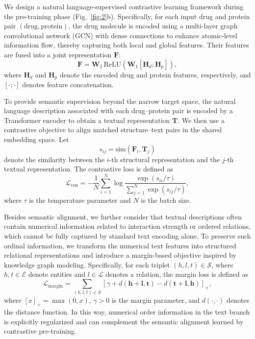 \documentclass[unnumsec,webpdf,contemporary,large]{oup-authoring-template}%
\theoremstyle{thmstyleone}%
\theoremstyle{thmstyletwo}%
\theoremstyle{thmstylethree}%
\begin{document}
We design a natural language-supervised contrastive learning framework during the pre-training phase (Fig.~\ref{fig:2}b). Specifically, for each input drug and protein pair $(\text{drug},\text{protein})$, the drug molecule is encoded using a multi-layer graph convolutional network (GCN) with dense connections to enhance atomic-level information flow, thereby capturing both local and global features. Their features are fused into a joint representation $\mathbf{F}$:
\begin{equation}
\mathbf{F} = \mathbf{W}_2 \, \mathrm{ReLU}\!\left(\mathbf{W}_1[\mathbf{H}_d;\mathbf{H}_p]\right),
\end{equation}
where $\mathbf{H}_d$ and $\mathbf{H}_p$ denote the encoded drug and protein features, respectively, and $[\cdot;\cdot]$ denotes feature concatenation.

To provide semantic supervision beyond the narrow target space, the natural language description associated with each drug--protein pair is encoded by a Transformer encoder to obtain a textual representation $\mathbf{T}$. We then use a contrastive objective to align matched structure--text pairs in the shared embedding space. Let
\begin{equation}
s_{ij} = \mathrm{sim}(\mathbf{F}_i,\mathbf{T}_j)
\end{equation}
denote the similarity between the $i$-th structural representation and the $j$-th textual representation. The contrastive loss is defined as
\begin{equation}
\mathcal{L}_{\mathrm{con}} =
-\frac{1}{N}\sum_{i=1}^{N}
\log
\frac{\exp(s_{ii}/\tau)}
{\sum_{j=1}^{N}\exp(s_{ij}/\tau)},
\end{equation}
where $\tau$ is the temperature parameter and $N$ is the batch size.

Besides semantic alignment, we further consider that textual descriptions often contain numerical information related to interaction strength or ordered relations, which cannot be fully captured by standard text encoding alone. To preserve such ordinal information, we transform the numerical text features into structured relational representations and introduce a margin-based objective inspired by knowledge graph modeling. Specifically, for each triplet $(h,l,t)\in\mathcal{S}$, where $h,t\in\mathcal{E}$ denote entities and $l\in\mathcal{L}$ denotes a relation, the margin loss is defined as
\begin{equation}
\mathcal{L}_{\mathrm{margin}}
=
\sum_{(h,l,t)\in\mathcal{S}}
\left[
\gamma + d(\mathbf{h}+\mathbf{l},\mathbf{t}) - d(\mathbf{t}+\mathbf{l},\mathbf{h})
\right]_+,
\end{equation}
where $[x]_+=\max(0,x)$, $\gamma>0$ is the margin parameter, and $d(\cdot,\cdot)$ denotes the distance function. In this way, numerical order information in the text branch is explicitly regularized and can complement the semantic alignment learned by contrastive pre-training.
\end{document}
